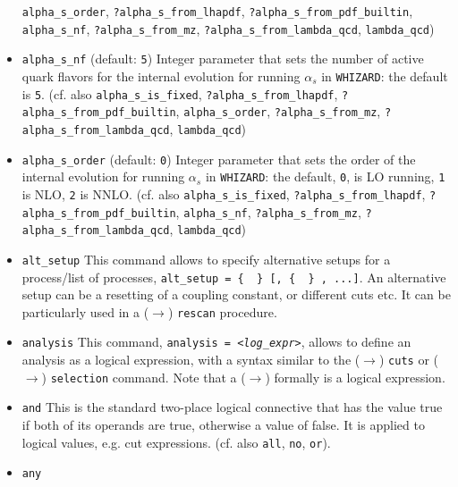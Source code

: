 \documentclass[12pt]{book}
\newcommand{\ttt}[1]{\texttt{#1}}
\newcommand{\whizard}{\texttt{WHIZARD}}
\begin{document}
\begin{itemize}
\ttt{alpha\_s\_order}, \ttt{?alpha\_s\_from\_lhapdf},
\ttt{?alpha\_s\_from\_pdf\_builtin}, \ttt{alpha\_s\_nf},
\ttt{?alpha\_s\_from\_mz}, \newline
\ttt{?alpha\_s\_from\_lambda\_qcd}, \ttt{lambda\_qcd})  
\item
\ttt{alpha\_s\_nf} \qquad (default: \ttt{5}) \newline 
Integer parameter that sets the number of active quark flavors for the
internal evolution for running $\alpha_s$ in \whizard: the default is
\ttt{5}. (cf. also \ttt{alpha\_s\_is\_fixed},
\ttt{?alpha\_s\_from\_lhapdf}, \ttt{?alpha\_s\_from\_pdf\_builtin},
\ttt{alpha\_s\_order}, \ttt{?alpha\_s\_from\_mz}, \newline 
\ttt{?alpha\_s\_from\_lambda\_qcd}, \ttt{lambda\_qcd}) 
\item
\ttt{alpha\_s\_order} \qquad (default: \ttt{0}) \newline 
Integer parameter that sets the order of the internal evolution for
running $\alpha_s$ in \whizard: the default, \ttt{0}, is LO running,
\ttt{1} is NLO, \ttt{2} is NNLO. (cf. also
\ttt{alpha\_s\_is\_fixed}, \ttt{?alpha\_s\_from\_lhapdf},
\ttt{?alpha\_s\_from\_pdf\_builtin}, \ttt{alpha\_s\_nf},
\ttt{?alpha\_s\_from\_mz}, \newline
\ttt{?alpha\_s\_from\_lambda\_qcd}, \ttt{lambda\_qcd}) 
\item
\ttt{alt\_setup} \newline
This command allows to specify alternative setups for a process/list
of processes, \ttt{alt\_setup = \{ {\em <setup1>} \} [, \{ {\em <setup2>} \} ,
  ...]}. An alternative setup can be a resetting of a coupling
constant, or different cuts etc. It can be particularly used in a
($\to$) \ttt{rescan} procedure. 
\item
\ttt{analysis} \newline
This command, \ttt{analysis = {\em <log\_expr>}}, allows to define an
analysis as a logical expression, with a syntax similar to the ($\to$)
\ttt{cuts} or ($\to$) \ttt{selection} command. Note that a ($\to$)
formally is a logical expression. 
\item
\ttt{and} \newline
This is the standard two-place logical connective that has the value
true if both of its operands are true, otherwise a value of false. It
is applied to logical values, e.g. cut expressions. (cf. also
\ttt{all}, \ttt{no}, \ttt{or}).
\item
\ttt{any} \newline

\end{itemize}
\end{document}
